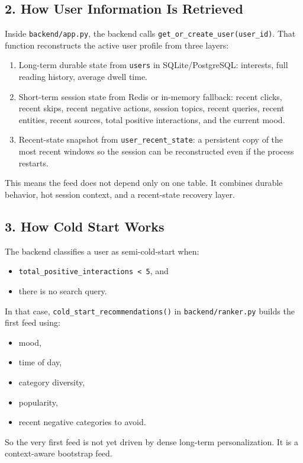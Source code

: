 \documentclass[12pt]{article}
\begin{document}
\subsection{2. How User Information Is Retrieved}
Inside \texttt{backend/app.py}, the backend calls \texttt{get\_or\_create\_user(user\_id)}. That function reconstructs the active user profile from three layers:
\begin{enumerate}[leftmargin=1.5em]
  \item Long-term durable state from \texttt{users} in SQLite/PostgreSQL:
  interests, full reading history, average dwell time.
  \item Short-term session state from Redis or in-memory fallback:
  recent clicks, recent skips, recent negative actions, session topics, recent queries, recent entities, recent sources, total positive interactions, and the current mood.
  \item Recent-state snapshot from \texttt{user\_recent\_state}:
  a persistent copy of the most recent windows so the session can be reconstructed even if the process restarts.
\end{enumerate}

This means the feed does not depend only on one table. It combines durable behavior, hot session context, and a recent-state recovery layer.

\subsection{3. How Cold Start Works}
The backend classifies a user as semi-cold-start when:
\begin{itemize}[leftmargin=1.5em]
  \item \texttt{total\_positive\_interactions < 5}, and
  \item there is no search query.
\end{itemize}

In that case, \texttt{cold\_start\_recommendations()} in \texttt{backend/ranker.py} builds the first feed using:
\begin{itemize}[leftmargin=1.5em]
  \item mood,
  \item time of day,
  \item category diversity,
  \item popularity,
  \item recent negative categories to avoid.
\end{itemize}

So the very first feed is not yet driven by dense long-term personalization. It is a context-aware bootstrap feed.
\end{document}
